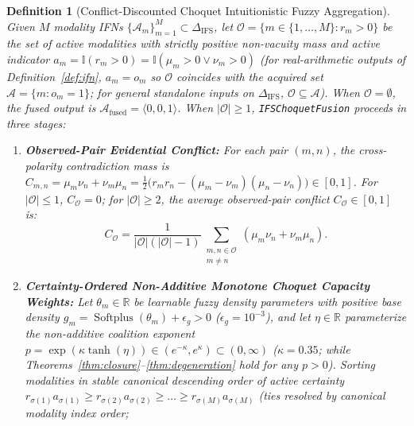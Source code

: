 \documentclass[10pt,twocolumn]{article}
\newtheorem{definition}{Definition}
\begin{document}
\begin{definition}[Conflict-Discounted Choquet Intuitionistic Fuzzy Aggregation]
\label{def:choquet}
Given $M$ modality IFNs $\{\mathcal{A}_m\}_{m=1}^M \subset \Delta_{\text{IFS}}$, let
$\mathcal{O} = \{m \in \{1,\dots,M\} : r_m > 0\}$ be the set of active modalities with strictly
positive non-vacuity mass and active indicator $a_m = \mathbb{I}(r_m > 0) = \mathbb{I}(\mu_m >
0 \lor \nu_m > 0)$ (for real-arithmetic outputs of Definition~\ref{def:ifn}, $a_m = o_m$ so
$\mathcal{O}$ coincides with the acquired set $\mathcal{A} = \{m : o_m = 1\}$; for general
standalone inputs on $\Delta_{\text{IFS}}$, $\mathcal{O} \subseteq \mathcal{A}$). When
$\mathcal{O} = \emptyset$, the fused output is $\mathcal{A}_{\text{fused}} = \langle 0, 0,
1\rangle$. When $|\mathcal{O}| \ge 1$, \texttt{IFSChoquetFusion} proceeds in three stages:
\begin{enumerate}[leftmargin=1.4em,itemsep=1pt]
    \item \textbf{Observed-Pair Evidential Conflict:} For each pair $(m, n)$, the
    cross-polarity contradiction mass is $C_{m,n} = \mu_m \nu_n + \nu_m \mu_n =
    \frac{1}{2}\big(r_m r_n - (\mu_m - \nu_m)(\mu_n - \nu_n)\big) \in [0, 1]$. For
    $|\mathcal{O}| \le 1$, $C_{\mathcal{O}} = 0$; for $|\mathcal{O}| \ge 2$, the average
    observed-pair conflict $C_{\mathcal{O}} \in [0, 1]$ is:
    \begin{equation}
    \label{eq:conflict_obs}
    C_{\mathcal{O}} = \frac{1}{|\mathcal{O}|(|\mathcal{O}|-1)} \sum_{\substack{m,n \in
    \mathcal{O}\\ m \neq n}} (\mu_m \nu_n + \nu_m \mu_n).
    \end{equation}
    \item \textbf{Certainty-Ordered Non-\allowbreak Additive Monotone Choquet Capacity
    Weights:} Let $\theta_m \in \mathbb{R}$ be learnable fuzzy density parameters with positive
    base density $g_m = \allowbreak \operatorname{Softplus}(\theta_m) + \allowbreak \epsilon_g
    > 0$ ($\epsilon_g = 10^{-3}$), and let $\eta \in \mathbb{R}$ parameterize the
    non-\allowbreak additive coalition exponent $p = \allowbreak \exp(\kappa \tanh(\eta)) \in
    (e^{-\kappa}, e^\kappa) \subset (0, \infty)$ ($\kappa = 0.35$; while
    Theorems~\ref{thm:closure}--\ref{thm:degeneration} hold for any $p > 0$). Sorting
    modalities in stable canonical descending order of active certainty $r_{\sigma(1)}
    a_{\sigma(1)} \ge \allowbreak r_{\sigma(2)} a_{\sigma(2)} \ge \allowbreak \dots \ge
    \allowbreak r_{\sigma(M)} a_{\sigma(M)}$ (ties resolved by canonical modality index order;

\end{enumerate}
\end{definition}
\end{document}
